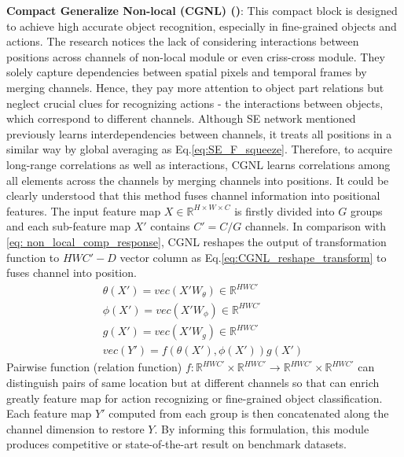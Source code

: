 \textbf{Compact Generalize Non-local (CGNL) (\textcolor{cyan}{\cite{yue2018compact}})}:
This compact block is designed to achieve high accurate object recognition, especially in fine-grained objects and actions. The research notices the lack of considering interactions between positions across channels of non-local module or even criss-cross module. They solely capture dependencies between spatial pixels and temporal frames by merging channels. Hence, they pay more attention to object part relations but neglect crucial clues for recognizing actions - the interactions between objects, which correspond to different channels. Although SE network mentioned previously learns interdependencies between channels, it treats all positions in a similar way by global averaging as Eq.\ref{eq:SE_F_squeeze}. Therefore, to acquire long-range correlations as well as interactions, CGNL learns correlations among all elements across the channels by merging channels into positions. It could be clearly understood that this method fuses channel information into positional features. The input feature map $X \in \mathbb{R}^{H \times W \times C}$ is firstly divided into $G$ groups and each sub-feature map $X'$ contains $C' = C/G$ channels. In comparison with \ref{eq: non_local_comp_response}, CGNL reshapes the output of transformation function to $HWC'-D$ vector column as Eq.\ref{eq:CGNL_reshape_transform} to fuses channel into position.
\begin{gather}
\label{eq:CGNL_reshape_transform}
\theta(X') = vec(X'W_{\theta}) \in \mathbb{R}^{HWC'} 	\\
\phi(X') = vec(X'W_{\phi}) \in \mathbb{R}^{HWC'}		\\
g(X') = vec(X'W_g) \in \mathbb{R}^{HWC'}				\\
\label{eq:CGNL_compute_response}
vec(Y') = f(\theta(X'), \phi(X'))g(X') \
\end{gather}
Pairwise function (relation function) $f:\mathbb{R}^{HWC'}\times\mathbb{R}^{HWC'} \rightarrow \mathbb{R}^{HWC'}\times\mathbb{R}^{HWC'}$ can distinguish pairs of same location but at different channels so that can enrich greatly feature map for action recognizing or fine-grained object classification. Each feature map $Y'$ computed from each group is then concatenated along the channel dimension to restore $Y$. By informing this formulation, this module produces competitive or state-of-the-art result on benchmark datasets.

